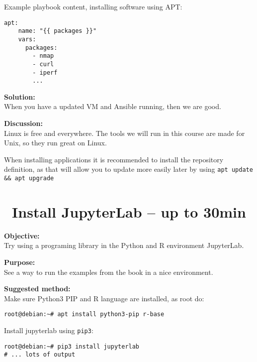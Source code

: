 \documentclass[a4paper,11pt,notitlepage]{report}
\begin{document}
Example playbook content, installing software using APT:
\begin{verbatim}
apt:
    name: "{{ packages }}"
    vars:
      packages:
        - nmap
        - curl
        - iperf
        ...
\end{verbatim}

{\bf Solution:}\\
When you have a updated VM and Ansible running, then we are good.

{\bf Discussion:}\\
Linux is free and everywhere. The tools we will run in this course are made for Unix, so they run great on Linux.

When installing applications it is recommended to install the repository definition, as that will allow you to update more easily later by using \verb+apt update && apt upgrade+


\chapter{\faInfoCircle\ Install JupyterLab -- up to 30min}
\label{ex-python-Jupyterlab}


{\bf Objective:}\\
Try using a programing library in the Python and R environment JupyterLab.

{\bf Purpose:}\\
See a way to run the examples from the book in a nice environment.

{\bf Suggested method:}\\
Make sure Python3 PIP and R language are installed, as root do:
\begin{verbatim}
root@debian:~# apt install python3-pip r-base
\end{verbatim}

Install jupyterlab using \verb+pip3+:
\begin{verbatim}
root@debian:~# pip3 install jupyterlab
# ... lots of output
\end{verbatim}

\eject
\end{document}
